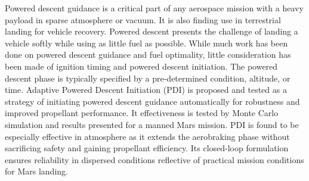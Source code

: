 


%

Powered descent guidance is a critical part of any aerospace mission with a heavy payload in sparse atmosphere or vacuum. It is also finding use in terrestrial landing for vehicle recovery. Powered descent presents the challenge of landing a vehicle softly while using as little fuel as possible. While much work has been done on powered descent guidance and fuel optimality, little consideration has been made of ignition timing and powered descent initiation. The powered descent phase is typically specified by a pre-determined condition, altitude, or time. Adaptive Powered Descent Initiation (PDI) is proposed and tested as a strategy of initiating powered descent guidance automatically for robustness and improved propellant performance. It effectiveness is tested by Monte Carlo simulation and results presented for a manned Mars mission. PDI is found to be especially effective in atmosphere as it extends the aerobraking phase without sacrificing safety and gaining propellant efficiency. Its closed-loop formulation ensures reliability in dispersed conditions reflective of practical mission conditions for Mars landing.
